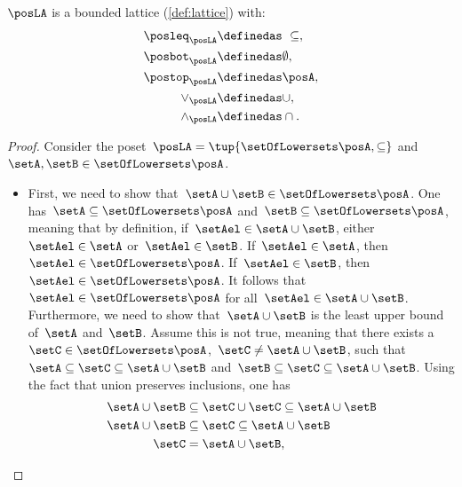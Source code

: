 \begin{lemma}
    $\posLA$ is a bounded lattice (\cref{def:lattice}) with:
    \begin{equation}
        \begin{aligned}
            \posleq_{\posLA} & \definedas \ \subseteq, \\
            \posbot_{\posLA} & \definedas \emptyset,   \\
            \postop_{\posLA} & \definedas \posA,    \\
            \vee_{\posLA}    & \definedas \cup,        \\
            \wedge_{\posLA}  & \definedas \cap.
        \end{aligned}
    \end{equation}
\end{lemma}
\begin{proof}
    Consider the poset~$\posLA=\tup{\setOfLowersets \posA,\subseteq}$ and~$\setA,\setB\in \setOfLowersets \posA$.
    \begin{itemize}
        \item First, we need to show that~$\setA\cup \setB\in \setOfLowersets \posA$.
              One has~$\setA \subseteq \setOfLowersets \posA$ and~$\setB\subseteq \setOfLowersets \posA$, meaning that by definition, if~$\setAel\in \setA\cup \setB$, either~$\setAel\in \setA$ or~$\setAel\in \setB$.
              If~$\setAel\in \setA$, then~$\setAel\in \setOfLowersets \posA$.
              If~$\setAel\in \setB$, then~$\setAel\in \setOfLowersets \posA$.
              It follows that~$\setAel\in \setOfLowersets \posA$ for all~$\setAel\in \setA\cup \setB$.
              Furthermore, we need to show that~$\setA\cup \setB$ is the least upper bound of~$\setA$ and~$\setB$.
              Assume this is not true, meaning that there exists a~$\setC\in \setOfLowersets \posA$,~$\setC\neq \setA\cup \setB$, such that~$\setA\subseteq \setC\subseteq \setA\cup \setB$ and~$\setB\subseteq \setC\subseteq \setA\cup \setB$.
              Using the fact that union preserves inclusions, one has
              \begin{equation}
                  \begin{aligned}
                      \setA\cup \setB & \subseteq \setC\cup \setC \subseteq \setA\cup \setB \\
                      \setA\cup \setB & \subseteq \setC \subseteq \setA\cup \setB           \\
                      \setC           & = \setA\cup \setB,
                  \end{aligned}

\end{equation}
\end{itemize}
\end{proof}
